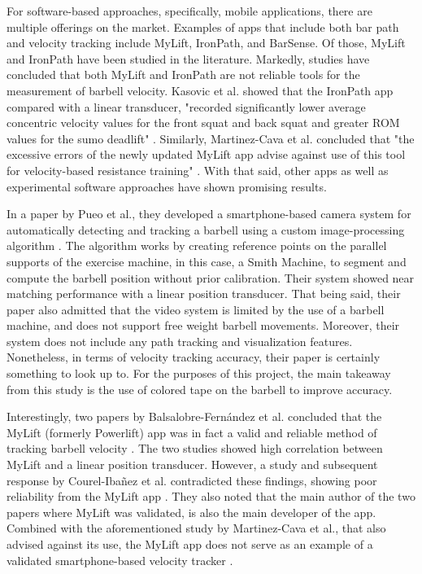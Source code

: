 \documentclass[10pt,twocolumn]{article}
\begin{document}
For software-based approaches, specifically, mobile applications, there are multiple offerings on the market.
Examples of apps that include both bar path and velocity tracking include MyLift, IronPath, and BarSense.
Of those, MyLift and IronPath have been studied in the literature.
Markedly, studies have concluded that both MyLift and IronPath are not reliable tools for the measurement of barbell velocity.
Kasovic et al. showed that the IronPath app compared with a linear transducer, "recorded significantly lower average concentric velocity values for the front squat and back squat and greater ROM values for the sumo deadlift" \cite{Kasovic2021}.
Similarly, Martinez-Cava et al. concluded that "the excessive errors of the newly updated MyLift app advise against use of this tool for velocity-based resistance training" \cite{Martinez-Cava2020}.
With that said, other apps as well as experimental software approaches have shown promising results. \par

In a paper by Pueo et al., they developed a smartphone-based camera system for automatically detecting and tracking a barbell using a custom image-processing algorithm \cite{Pueo2021}.
The algorithm works by creating reference points on the parallel supports of the exercise machine, in this case, a Smith Machine, to segment and compute the barbell position without prior calibration.
Their system showed near matching performance with a linear position transducer.
That being said, their paper also admitted that the video system is limited by the use of a barbell machine, and does not support free weight barbell movements.
Moreover, their system does not include any path tracking and visualization features.
Nonetheless, in terms of velocity tracking accuracy, their paper is certainly something to look up to.
For the purposes of this project, the main takeaway from this study is the use of colored tape on the barbell to improve accuracy.\par

Interestingly, two papers by Balsalobre-Fern\'andez et al. concluded that the MyLift (formerly Powerlift) app was in fact a valid and reliable method of tracking barbell velocity \cite{Balsalobre-Fernández2017, Balsalobre-Fernández2018}. 
The two studies showed high correlation between MyLift and a linear position transducer.
However, a study and subsequent response by Courel-Iba\~nez et al. contradicted these findings, showing poor reliability from the MyLift app \cite{Courel-Ibáñez2020}.
They also noted that the main author of the two papers where MyLift was validated, is also the main developer of the app.
Combined with the aforementioned study by Martinez-Cava et al., that also advised against its use, the MyLift app does not serve as an example of a validated smartphone-based velocity tracker \cite{Martinez-Cava2020}.
\end{document}
